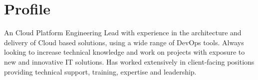 \section{Profile}

An Cloud Platform Engineering Lead with experience in the architecture 
and delivery of Cloud based solutions, using a wide 
range of DevOps tools. Always looking to increase technical 
knowledge and work on projects with exposure to new and innovative 
IT solutions. Has worked extensively in client-facing positions 
providing technical support, training, expertise and leadership.

\closesection{}

